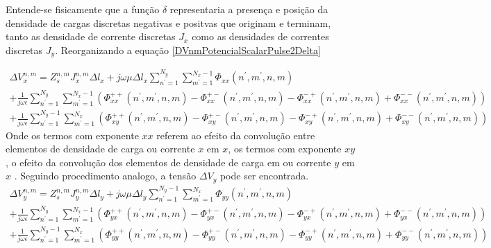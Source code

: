 \documentclass[
	12pt,				%
	openright,			%
	oneside,			%
	a4papey79r,			%
	english,			%
	brazil				%
	]{abntex2}
\begin{document}
Entende-se fisicamente que a função $\delta$ representaria a presença e posição da densidade de cargas discretas negativas e positvas que originam e terminam, tanto as densidade de corrente discretas $J_x$ como as  densidades de correntes discretas $J_y$. Reorganizando a equação \ref{DVnmPotencialScalarPulse2Delta}

\begin{equation}\label{TensãoCadaElementoNM}
\begin{aligned}
    \Delta V_{x}^{n,m}=Z_s^{n,m}  J_{x}^{n,m} \Delta l_x 
    + 
    j\omega \mu  \Delta l_x \sum^{N_y}_{n^{'}=1} \sum^{N_x -1}_{m^{'}=1} \Phi_{xx}(n^{'},m^{'},n,m) \\  
    +
    \frac{1}{j \omega \epsilon} \sum^{N_y}_{n^{'}=1} \sum^{N_x -1}_{m^{'}=1}(\Phi_{xx}^{++}(n^{'},m^{'},n,m)-\Phi_{xx}^{+-}(n^{'},m^{'},n,m)-\Phi_{xx}^{-+}(n^{'},m^{'},n,m)+\Phi_{xx}^{--}(n^{'},m^{'},n,m)) \\
    +
    \frac{1}{j \omega \epsilon} \sum^{N_y-1}_{n^{'}=1} \sum^{N_x}_{m^{'}=1}(\Phi_{xy}^{++}(n^{'},m^{'},n,m)-\Phi_{xy}^{+-}(n^{'},m^{'},n,m)-\Phi_{xy}^{-+}(n^{'},m^{'},n,m)+\Phi_{xy}^{--}(n^{'},m^{'},n,m))
\end{aligned}
\end{equation}
Onde os termos com exponente $xx$ referem ao efeito da convolução entre elementos de densidade de carga ou corrente $x$ em $x$,  os termos com exponente $xy$, o efeito da convolução dos elementos de densidade de carga em ou corrente $y$ em $x$ . Seguindo procedimento analogo, a tensão $\Delta V_y$ pode ser encontrada. 
\begin{equation}\label{TensãoCadaElementoNM}
\begin{aligned}
    \Delta V_{y}^{n,m}=Z_s^{n,m}  J_{y}^{n,m} \Delta l_y 
    + 
    j\omega \mu  \Delta l_y \sum^{N_y-1}_{n^{'}=1} \sum^{N_x}_{m^{'}=1} \Phi_{yy}(n^{'},m^{'},n,m) \\  
    +
    \frac{1}{j \omega \epsilon} \sum^{N_y}_{n^{'}=1} \sum^{N_x -1}_{m^{'}=1}(\Phi_{yx}^{++}(n^{'},m^{'},n,m)-\Phi_{yx}^{+-}(n^{'},m^{'},n,m)-\Phi_{yx}^{-+}(n^{'},m^{'},n,m)+\Phi_{yx}^{--}(n^{'},m^{'},n,m)) \\
    +
    \frac{1}{j \omega \epsilon} \sum^{N_y-1}_{n^{'}=1} \sum^{N_x}_{m^{'}=1}(\Phi_{yy}^{++}(n^{'},m^{'},n,m)-\Phi_{yy}^{+-}(n^{'},m^{'},n,m)-\Phi_{yy}^{-+}(n^{'},m^{'},n,m)+\Phi_{yy}^{--}(n^{'},m^{'},n,m))
\end{aligned}
\end{equation}
\end{document}
